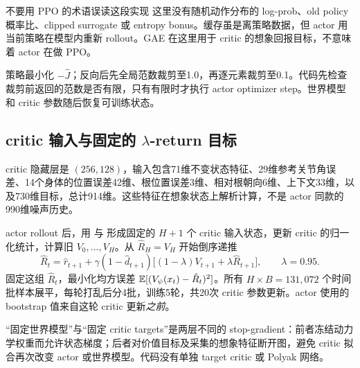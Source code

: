 \begin{caution}{不要用 PPO 的术语误读这段实现}
这里没有随机动作分布的 log-prob、old policy 概率比、clipped surrogate 或 entropy bonus。缓存虽是离策略数据，但 actor 用当前策略在模型内重新 rollout。GAE 在这里用于 critic 的想象回报目标，不意味着 actor 在做 PPO。
\end{caution}

策略最小化 $-\hat J$；反向后先全局范数裁剪至1.0，再逐元素裁剪至0.1。代码先检查裁剪前返回的范数是否有限，只有有限时才执行 actor optimizer step。世界模型和 critic 参数随后恢复可训练状态。

\subsection{critic 输入与固定的 \texorpdfstring{$\lambda$}{lambda}-return 目标}
critic 隐藏层是 $(256,128)$，输入包含71维不变状态特征、29维参考关节角误差、14个身体的位置误差42维、根位置误差3维、相对根朝向6维、上下文33维，以及730维目标，总计914维。这些特征在想象状态上解析计算，不是 actor 同款的990维噪声历史。

actor rollout 后，用  与  形成固定的 $H+1$ 个 critic 输入状态，更新 critic 的归一化统计，计算旧 $V_0,\ldots,V_H$。从 $\hat R_H=V_H$ 开始倒序递推
\begin{equation}\label{eq:lambda}
 \hat R_t=\hat r_{t+1}+\gamma(1-\hat d_{t+1})
 \big[(1-\lambda)V_{t+1}+\lambda\hat R_{t+1}\big],\qquad\lambda=0.95.
\end{equation}
固定这组 $\hat R_t$，最小化均方误差 $\mathbb{E}[(V_\psi(x_t)-\hat R_t)^2]$。所有 $H\times B=131,072$ 个时间批样本展平，每轮打乱后分4批，训练5轮，共20次 critic 参数更新。actor 使用的 bootstrap 值来自这轮 critic 更新\emph{之前}。

“固定世界模型”与“固定 critic targets”是两层不同的 stop-gradient：前者冻结动力学权重而允许状态梯度；后者对价值目标及采集的想象特征断开图，避免 critic 拟合再次改变 actor 或世界模型。代码没有单独 target critic 或 Polyak 网络。
